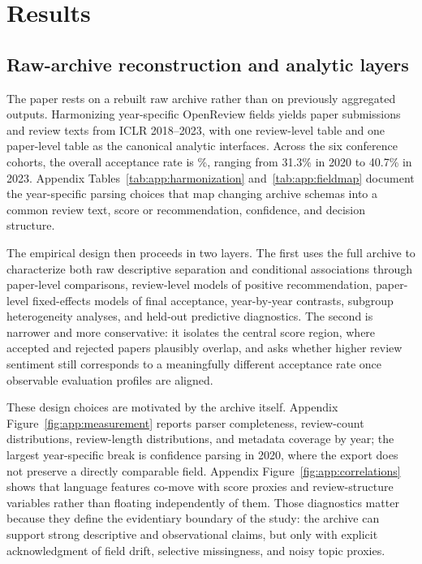 \documentclass[9pt,twocolumn]{pnas-new}
\begin{document}
\section{Results}

\subsection{Raw-archive reconstruction and analytic layers}

The paper rests on a rebuilt raw archive rather than on previously aggregated outputs. Harmonizing year-specific OpenReview fields yields \TotalPapers{} paper submissions and \TotalReviews{} review texts from ICLR 2018--2023, with one review-level table and one paper-level table as the canonical analytic interfaces. Across the six conference cohorts, the overall acceptance rate is \OverallAcceptancePct\%, ranging from 31.3\% in 2020 to 40.7\% in 2023. Appendix Tables~\ref{tab:app:harmonization} and~\ref{tab:app:fieldmap} document the year-specific parsing choices that map changing archive schemas into a common review text, score or recommendation, confidence, and decision structure.

The empirical design then proceeds in two layers. The first uses the full archive to characterize both raw descriptive separation and conditional associations through paper-level comparisons, review-level models of positive recommendation, paper-level fixed-effects models of final acceptance, year-by-year contrasts, subgroup heterogeneity analyses, and held-out predictive diagnostics. The second is narrower and more conservative: it isolates the central score region, where accepted and rejected papers plausibly overlap, and asks whether higher review sentiment still corresponds to a meaningfully different acceptance rate once observable evaluation profiles are aligned.

These design choices are motivated by the archive itself. Appendix Figure~\ref{fig:app:measurement} reports parser completeness, review-count distributions, review-length distributions, and metadata coverage by year; the largest year-specific break is confidence parsing in 2020, where the export does not preserve a directly comparable field. Appendix Figure~\ref{fig:app:correlations} shows that language features co-move with score proxies and review-structure variables rather than floating independently of them. Those diagnostics matter because they define the evidentiary boundary of the study: the archive can support strong descriptive and observational claims, but only with explicit acknowledgment of field drift, selective missingness, and noisy topic proxies.
\end{document}
